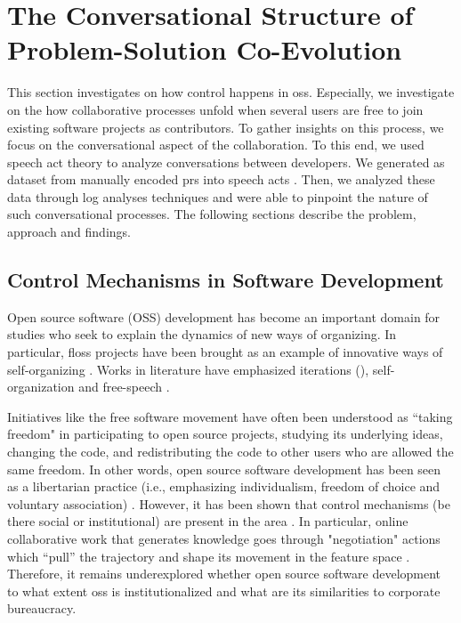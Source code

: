 \section{The Conversational Structure of Problem-Solution Co-Evolution}
\label{sec:conversational-structure}

This section investigates on how control happens in \gls{oss}. Especially, we investigate on the how collaborative processes unfold when several users are free to join existing software projects as contributors. To gather insights on this process, we focus on the conversational aspect of the collaboration. To this end, we used speech act theory to analyze conversations between developers. We generated as dataset from manually encoded \glspl{pr} into speech acts \citep{searle1985expression}. Then, we analyzed these data through log analyses techniques and were able to pinpoint the nature of such conversational processes. The following sections describe the problem, approach and findings.

\subsection{Control Mechanisms in Software Development}

Open source software (OSS) development has become an important domain for studies who seek to explain the dynamics of new ways of organizing. In particular, \gls{floss} projects have been brought as an example of innovative ways of self-organizing \citep{DBLP:journals/mansci/KroghH06,DBLP:journals/misq/HowisonC14}. Works in literature have emphasized iterations (\citealp{Berente2005,Berente2007}), self-organization \citep{DBLP:journals/infsof/CrowstonLWEH07,DBLP:journals/jss/HodaM16} and free-speech \citep{DBLP:conf/chiir/ThomasCMCM18,Gibson2019}. 

Initiatives like the free software movement have often been understood as ``taking freedom" in participating to open source projects, studying its underlying ideas, changing the code, and redistributing the code to other users who are allowed the same freedom. In other words, open source software development has been seen as a libertarian practice (i.e., emphasizing individualism, freedom of choice and voluntary association) \citep{stallman2002free}. However, it has been shown that control mechanisms (be there social or institutional) are present in the area \citep{Lindberg2016}. In particular, online collaborative work that generates knowledge goes through "negotiation" actions which “pull” the trajectory and shape its movement in the feature space \citep{Arazy2020}. Therefore, it remains underexplored whether open source software development to what extent \gls{oss} is institutionalized and what are its similarities to corporate bureaucracy.



